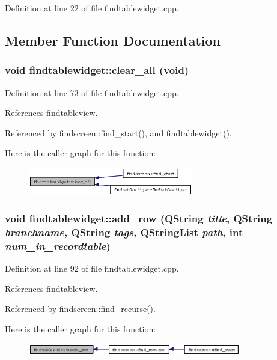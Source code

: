 Definition at line 22 of file findtablewidget.cpp.

\subsection{Member Function Documentation}
\subsubsection{\setlength{\rightskip}{0pt plus 5cm}void findtablewidget::clear\_\-all (void)}\label{classfindtablewidget_650cffb5374085b37d54d3c59280883e}




Definition at line 73 of file findtablewidget.cpp.

References findtableview.

Referenced by findscreen::find\_\-start(), and findtablewidget().

Here is the caller graph for this function:\begin{figure}[H]
\begin{center}
\leavevmode
\includegraphics[width=204pt]{classfindtablewidget_650cffb5374085b37d54d3c59280883e_icgraph}
\end{center}
\end{figure}
\subsubsection{\setlength{\rightskip}{0pt plus 5cm}void findtablewidget::add\_\-row (QString {\em title}, QString {\em branchname}, QString {\em tags}, QString\-List {\em path}, int {\em num\_\-in\_\-recordtable})}\label{classfindtablewidget_dcb157f224ebcada52420cda81c1cb41}




Definition at line 92 of file findtablewidget.cpp.

References findtableview.

Referenced by findscreen::find\_\-recurse().

Here is the caller graph for this function:\begin{figure}[H]
\begin{center}
\leavevmode
\includegraphics[width=263pt]{classfindtablewidget_dcb157f224ebcada52420cda81c1cb41_icgraph}
\end{center}
\end{figure}
